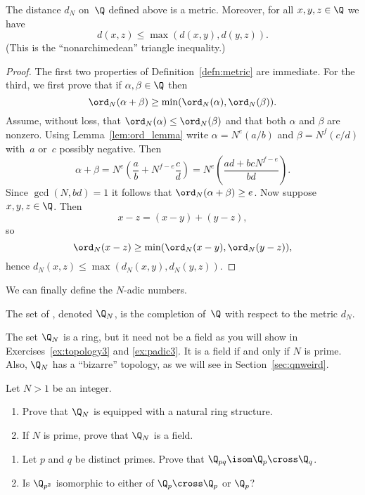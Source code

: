 \documentclass[11pt]{book}
\begin{document}
\begin{ch}
\begin{proposition}\label{prop:ismetric}
The distance $d_N$ on~$\Q$ defined above is a metric.  Moreover,
for all $x,y,z\in\Q$ we have
$$
 d(x,z) \leq \max(d(x,y),d(y,z)).
$$
(This is the ``nonarchimedean'' triangle inequality.)
\end{proposition}
\begin{proof}
The first two properties of Definition~\ref{defn:metric} are
immediate.  For the third, we first prove that if $\alpha,\beta\in\Q$
then
$$
 \ord_N(\alpha+\beta)\geq \min(\ord_N(\alpha),\ord_N(\beta)).
$$
Assume, without loss, that $\ord_N(\alpha) \leq \ord_N(\beta)$ and
that both $\alpha$ and $\beta$ are nonzero.
Using Lemma~\ref{lem:ord_lemma} write $\alpha=N^e(a/b)$ and
$\beta=N^f(c/d)$ with~$a$ or~$c$ possibly negative.  Then
$$
 \alpha + \beta = N^e \left(\frac{a}{b} + N^{f-e}\frac{c}{d}\right)
                = N^e \left(\frac{ad+bcN^{f-e}}{bd}\right).
$$
Since $\gcd(N,bd)=1$ it follows that $\ord_N(\alpha+\beta)\geq e$.
Now suppose $x,y, z\in \Q$.  Then
$$
 x-z = (x-y) + (y-z),
$$
so
$$
 \ord_N(x-z) \geq \min (\ord_N(x-y), \ord_N(y-z)),
$$
hence $d_N(x,z) \leq \max(d_N(x,y), d_N(y,z))$.
\end{proof}

We can finally define the $N$-adic numbers.
\begin{definition}
  The set of , denoted $\Q_N$, is the
  completion of~$\Q$ with respect to the metric $d_N$.
\end{definition}
The set $\Q_N$ is a ring,
but it need not be a field as you will show in Exercises~\ref{ex:topology3} and
\ref{ex:padic3}. It is a field if and only if $N$ is prime.
Also, $\Q_N$ has a ``bizarre'' topology,
as we will see in Section~\ref{sec:qnweird}.

\begin{exercise}\label{ex:topology3}
Let $N>1$ be an integer.
\begin{enumerate}
\item Prove that $\Q_N$ is equipped with a natural ring structure.
\item If $N$ is prime, prove that $\Q_N$ is a field.
\end{enumerate}
\end{exercise}

\begin{exercise}\label{ex:topology4}
\begin{enumerate}
\item Let $p$ and $q$ be distinct primes.  Prove that
$\Q_{pq} \isom \Q_p \cross \Q_q$.
\item Is $\Q_{p^2}$ isomorphic to either of $\Q_p\cross \Q_p$ or $\Q_p$?
\end{enumerate}


\end{exercise}
\end{ch}
\end{document}
